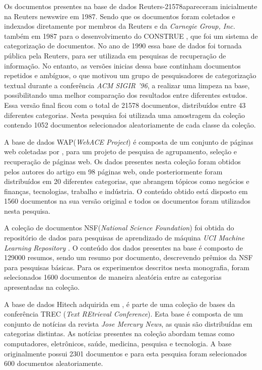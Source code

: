Os documentos presentes na base de dados Reuters-21578\footnotemark  apareceram inicialmente na
Reuters newswire em 1987. Sendo que os documentos foram coletados e indexados diretamente por
membros da Reuters e da {\it Carnegie Group, Inc.} também em 1987 para o desenvolvimento do
CONSTRUE \cite{Hayes1990}, que foi um sistema de categorização de documentos. No ano de 1990
essa base de dados foi tornada pública pela Reuters, para ser utilizada em pesquisas de recuperação
de informação. No entanto, as versões inicias dessa base continham documentos repetidos e ambíguos, o
que motivou um grupo de pesquisadores de categorização textual durante a conferência {\it ACM SIGIR
'96\/}, a realizar uma limpeza na base, possibilitando uma melhor comparação dos resultados entre
diferentes estudos. Essa versão final ficou com o total de 21578 documentos, distribuídos entre 43
diferentes categorias.  Nesta pesquisa foi utilizada uma amostragem da coleção
contendo 1052 documentos selecionados aleatoriamente de cada classe da coleção.

A base de dados WAP({\it WebACE Project\/}) é composta de um conjunto de páginas web coletadas por
, para um projeto de pesquisa de agrupamento, seleção e recuperação de páginas
web.  Os dados presentes nesta coleção foram obtidos pelos autores do artigo em 98 páginas web, onde
posteriormente foram distribuídos em 20 diferentes categorias, que abrangem tópicos como negócios e
finanças, tecnologias, trabalho e indústria. O conteúdo obtido está disposto em 1560 documentos na
sua versão original e todos os documentos foram utilizados nesta pesquisa.

A coleção de documentos NSF\footnotemark({\it National Science Foundation\/}) foi obtida do 
repositório de dados para pesquisas de aprendizado de máquina 
{\it UCI Machine Learning Repository} \cite{Frank2010}. O conteúdo dos dados presentes na base é
composto de 129000 resumos, sendo um resumo por documento, descrevendo prêmios da NSF para 
pesquisas básicas. Para os experimentos descritos nesta monografia, foram selecionados 1600 
documentos de maneira aleatória entre as categorias apresentadas na coleção.

A base de dados Hitech adquirida em , é parte de uma coleção de bases da
conferência TREC ({\it Text REtrieval Conference\/})\footnotemark.
 Esta base é composta de um conjunto de notícias
da revista {\it Jose Mercury News\/}\footnotemark, as quais são distribuídas em categorias
distintas. As notícias presentes na coleção abordam temas como computadores, eletrônicos, saúde,
medicina, pesquisa e tecnologia.  A base originalmente possui 2301 documentos e para esta pesquisa
foram selecionados 600 documentos aleatoriamente.  

